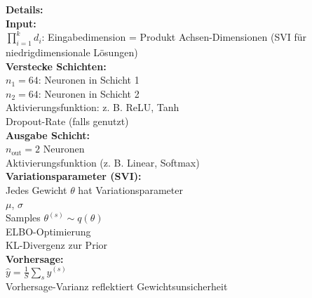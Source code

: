\begin{center}
\begin{minipage}[t]{0.47\textwidth}
{
}
\end{minipage}%
\hfill
\begin{minipage}[t]{0.48\textwidth}
\raggedright
\small
\textbf{Details:} \\[6pt]

\textbf{Input:} \\
$\prod_{i=1}^k d_i$: Eingabedimension = Produkt Achsen-Dimensionen (SVI für niedrigdimensionale Lösungen)\\[4pt]

\textbf{Verstecke Schichten:} \\
$n_1 = 64$: Neuronen in Schicht 1 \\
$n_2 = 64$: Neuronen in Schicht 2 \\
Aktivierungsfunktion: z. B. ReLU, Tanh \\
Dropout-Rate (falls genutzt) \\[4pt]

\textbf{Ausgabe Schicht:} \\
$n_\text{out} = 2$ Neuronen \\
Aktivierungsfunktion (z. B. Linear, Softmax) \\[4pt]

\textbf{Variationsparameter (SVI):} \\
Jedes Gewicht $\theta$ hat Variationsparameter \\
$\mu$, $\sigma$ \parencite[S. 6, Z. 20–23]{PyroPplDevelopers.2024} \\
Samples $\theta^{(s)} \sim q(\theta)$ \\
ELBO-Optimierung \parencite[S. 6, Z. 5–8]{PyroPplDevelopers.2024} \\
KL-Divergenz zur Prior \\[4pt]

\textbf{Vorhersage:} \\
$\hat{y} = \frac{1}{S} \sum_s y^{(s)}$ \\
Vorhersage-Varianz reflektiert Gewichtsunsicherheit \\[4pt]


\end{minipage}
\end{center}
